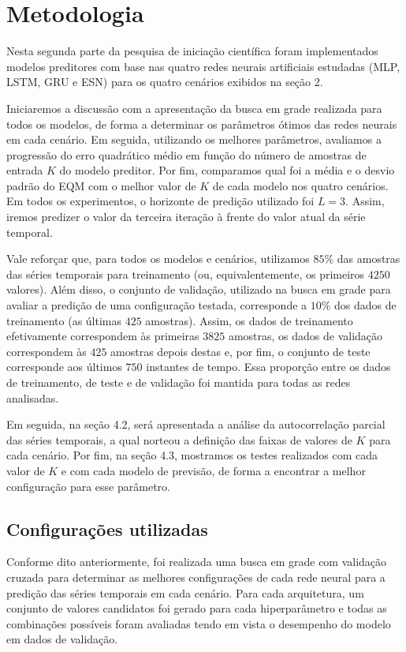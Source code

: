 \documentclass[a4paper, 12pt]{article}
\begin{document}
\section{Metodologia}

Nesta segunda parte da pesquisa de iniciação científica foram implementados modelos preditores com base nas quatro redes neurais artificiais estudadas (MLP, LSTM, GRU e ESN) para os quatro cenários exibidos na seção 2. 

Iniciaremos a discussão com a apresentação da busca em grade realizada para  todos os modelos, de forma a determinar os parâmetros ótimos das redes neurais em cada cenário. Em seguida, utilizando os melhores parâmetros, avaliamos a progressão do erro quadrático médio em função do número de amostras de entrada $K$ do modelo preditor. Por fim, comparamos qual foi a média e o desvio padrão do EQM com o melhor valor de $K$ de cada modelo nos quatro cenários. Em todos os experimentos, o horizonte de predição utilizado foi $L=3$. Assim, iremos predizer o valor da terceira iteração à frente do valor atual da série temporal.

Vale reforçar que, para todos os modelos e cenários, utilizamos $85\%$ das amostras das séries temporais para treinamento (ou, equivalentemente, os primeiros $4250$ valores).  Além disso, o conjunto de validação, utilizado na busca em grade para avaliar a predição de uma configuração testada, corresponde a $10\%$ dos dados de treinamento (as últimas $425$ amostras). Assim, os dados de treinamento efetivamente correspondem às primeiras $3825$ amostras, os dados de validação correspondem às $425$ amostras depois destas e, por fim, o conjunto de teste corresponde aos últimos $750$ instantes de tempo. Essa proporção entre os dados de treinamento, de teste e de validação foi mantida para todas as redes analisadas.

Em seguida, na seção 4.2, será apresentada a análise da autocorrelação parcial das séries temporais, a qual norteou a definição das faixas de valores de $K$ para cada cenário. Por fim, na seção 4.3, mostramos os testes realizados com cada valor de $K$ e com cada modelo de previsão, de forma a encontrar a melhor configuração para esse parâmetro. 

\subsection{Configurações utilizadas}

Conforme dito anteriormente, foi realizada uma busca em grade com validação cruzada para determinar as melhores configurações de cada rede neural para a predição das séries temporais em cada cenário. Para cada arquitetura, um conjunto de valores candidatos foi gerado para cada hiperparâmetro e todas as combinações possíveis foram avaliadas tendo em vista o desempenho do modelo em dados de validação.
\end{document}
